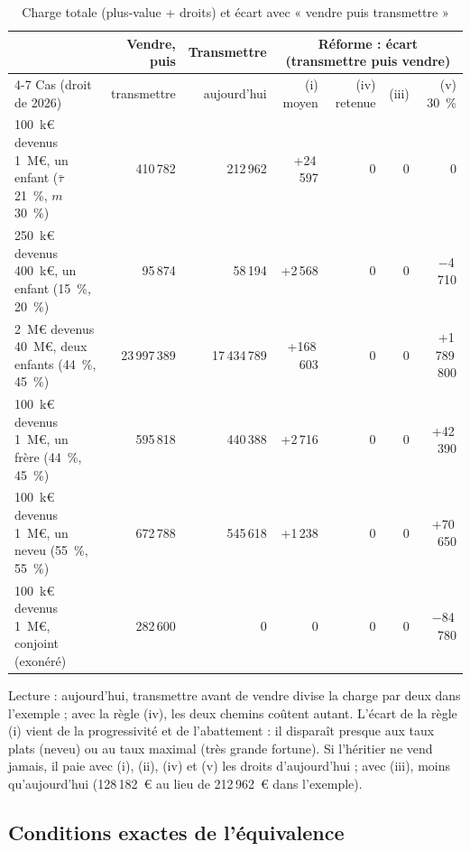 \begin{table}[!htbp]\centering\scriptsize\setlength{\tabcolsep}{4pt}
\caption{Charge totale (plus-value + droits) et écart avec « vendre puis transmettre »}\label{tab:cap_cas}
\begin{tabular}{@{}lrrrrrr@{}}
\toprule
 & Vendre, puis & Transmettre & \multicolumn{4}{c}{Réforme : écart (transmettre puis vendre)} \\
\cmidrule(l){4-7}
Cas (droit de 2026) & transmettre & aujourd'hui & (i) moyen & (iv) retenue & (iii) & (v) 30~\% \\
\midrule
100~k€ devenus 1~M€, un enfant ($\bar\tau$ 21~\%, $m$ 30~\%) & 410\,782 & 212\,962 & +24\,597 & 0 & 0 & 0 \\
250~k€ devenus 400~k€, un enfant (15~\%, 20~\%) & 95\,874 & 58\,194 & +2\,568 & 0 & 0 & $-$4\,710 \\
2~M€ devenus 40~M€, deux enfants (44~\%, 45~\%) & 23\,997\,389 & 17\,434\,789 & +168\,603 & 0 & 0 & +1\,789\,800 \\
100~k€ devenus 1~M€, un frère (44~\%, 45~\%) & 595\,818 & 440\,388 & +2\,716 & 0 & 0 & +42\,390 \\
100~k€ devenus 1~M€, un neveu (55~\%, 55~\%) & 672\,788 & 545\,618 & +1\,238 & 0 & 0 & +70\,650 \\
100~k€ devenus 1~M€, conjoint (exonéré) & 282\,600 & 0 & 0 & 0 & 0 & $-$84\,780 \\
\bottomrule
\end{tabular}
\par\vspace{3pt}\parbox{0.95\linewidth}{\raggedright\scriptsize Lecture : aujourd'hui, transmettre avant de vendre
divise la charge par deux dans l'exemple ; avec la règle (iv), les deux chemins coûtent autant. L'écart de la règle (i)
vient de la progressivité et de l'abattement : il disparaît presque aux taux plats (neveu) ou au taux maximal
(très grande fortune). Si l'héritier ne vend jamais, il paie avec (i), (ii), (iv) et (v) les droits d'aujourd'hui ;
avec (iii), moins qu'aujourd'hui (128\,182~€ au lieu de 212\,962~€ dans l'exemple).}
\end{table}

\subsection{Conditions exactes de l'équivalence}

